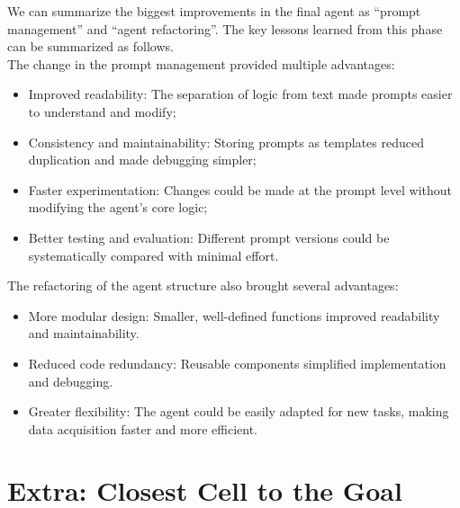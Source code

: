 We can summarize the biggest improvements in the final agent as ``prompt
management'' and ``agent refactoring''. The key lessons learned from this phase can
be summarized as follows.\\The change in the prompt management provided multiple
advantages:
\begin{itemize}
  \item Improved readability: The separation of logic from text made prompts
    easier to understand and modify;

  \item Consistency and maintainability: Storing prompts as templates reduced
    duplication and made debugging simpler;

  \item Faster experimentation: Changes could be made at the prompt level
    without modifying the agent's core logic;

  \item Better testing and evaluation: Different prompt versions could be
    systematically compared with minimal effort.
\end{itemize}
The refactoring of the agent structure also brought several advantages:
\begin{itemize}
  \item More modular design: Smaller, well-defined functions improved readability
    and maintainability.

  \item Reduced code redundancy: Reusable components simplified implementation
    and debugging.

  \item Greater flexibility: The agent could be easily adapted for new tasks, making
    data acquisition faster and more efficient.
\end{itemize}

\section{Extra: Closest Cell to the Goal}
\label{sec:closest_cell_to_the_goal}